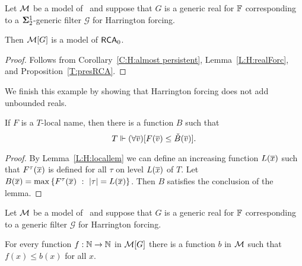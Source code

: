 \begin{thm}
Let $\mathcal{M}$ be a model of \RCAo\
and suppose that $G$ is a generic real for $\mathbb{F}$
corresponding to a $\mathbf{\Sigma}^1_2$-generic filter $\mathcal{G}$ for Harrington forcing.

Then $\mathcal{M}[G]$ is a model of $\mathsf{RCA}_0$.
\end{thm}
\begin{proof}
Follows from Corollary~\ref{C:H:almost persistent}, Lemma~\ref{L:H:realForc}, and Proposition~\ref{T:presRCA}.
\end{proof}

We finish this example by showing that Harrington
forcing does not add unbounded reals.

\begin{thm}[\RCAo]\label{P:H:bndedNames}
If $F$ is a $T$-local name, then there is a function $B$
such that $$T \Vdash (\forall\overline{v})[F(\overline{v}) \leq \check{B}(\overline{v})].$$
\end{thm}
\begin{proof}
By Lemma~\ref{L:H:locallem} we can define an increasing function
$L(\overline{x})$ such that $F^\tau(\overline{x})$ is defined for all $\tau$
on level $L(\overline{x})$ of $T$.
Let $B(\overline{x})=\max\left\{F^\tau(\overline{x})\ :\ |\tau|=L(\overline{x})\right\}$.
Then $B$ satisfies the conclusion of the lemma.
\end{proof}

\begin{cor}
Let $\mathcal{M}$ be a model of \RCAo\
and suppose that $G$ is a generic real for $\mathbb{F}$
corresponding to a generic filter $\mathcal{G}$ for Harrington forcing.

For every function $f:\mathbb{N}\to\mathbb{N}$ in $\mathcal{M}[G]$
there is a function $b$ in $\mathcal{M}$ such that
$f(x)\leq b(x)$ for all $x$.
\end{cor}
